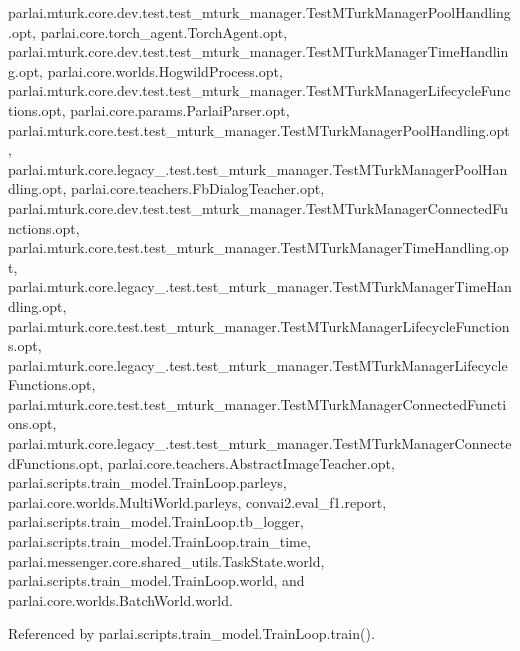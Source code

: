 parlai.\+mturk.\+core.\+dev.\+test.\+test\+\_\+mturk\+\_\+manager.\+Test\+M\+Turk\+Manager\+Pool\+Handling.\+opt, parlai.\+core.\+torch\+\_\+agent.\+Torch\+Agent.\+opt, parlai.\+mturk.\+core.\+dev.\+test.\+test\+\_\+mturk\+\_\+manager.\+Test\+M\+Turk\+Manager\+Time\+Handling.\+opt, parlai.\+core.\+worlds.\+Hogwild\+Process.\+opt, parlai.\+mturk.\+core.\+dev.\+test.\+test\+\_\+mturk\+\_\+manager.\+Test\+M\+Turk\+Manager\+Lifecycle\+Functions.\+opt, parlai.\+core.\+params.\+Parlai\+Parser.\+opt, parlai.\+mturk.\+core.\+test.\+test\+\_\+mturk\+\_\+manager.\+Test\+M\+Turk\+Manager\+Pool\+Handling.\+opt, parlai.\+mturk.\+core.\+legacy\+\_.\+test.\+test\+\_\+mturk\+\_\+manager.\+Test\+M\+Turk\+Manager\+Pool\+Handling.\+opt, parlai.\+core.\+teachers.\+Fb\+Dialog\+Teacher.\+opt, parlai.\+mturk.\+core.\+dev.\+test.\+test\+\_\+mturk\+\_\+manager.\+Test\+M\+Turk\+Manager\+Connected\+Functions.\+opt, parlai.\+mturk.\+core.\+test.\+test\+\_\+mturk\+\_\+manager.\+Test\+M\+Turk\+Manager\+Time\+Handling.\+opt, parlai.\+mturk.\+core.\+legacy\+\_.\+test.\+test\+\_\+mturk\+\_\+manager.\+Test\+M\+Turk\+Manager\+Time\+Handling.\+opt, parlai.\+mturk.\+core.\+test.\+test\+\_\+mturk\+\_\+manager.\+Test\+M\+Turk\+Manager\+Lifecycle\+Functions.\+opt, parlai.\+mturk.\+core.\+legacy\+\_.\+test.\+test\+\_\+mturk\+\_\+manager.\+Test\+M\+Turk\+Manager\+Lifecycle\+Functions.\+opt, parlai.\+mturk.\+core.\+test.\+test\+\_\+mturk\+\_\+manager.\+Test\+M\+Turk\+Manager\+Connected\+Functions.\+opt, parlai.\+mturk.\+core.\+legacy\+\_.\+test.\+test\+\_\+mturk\+\_\+manager.\+Test\+M\+Turk\+Manager\+Connected\+Functions.\+opt, parlai.\+core.\+teachers.\+Abstract\+Image\+Teacher.\+opt, parlai.\+scripts.\+train\+\_\+model.\+Train\+Loop.\+parleys, parlai.\+core.\+worlds.\+Multi\+World.\+parleys, convai2.\+eval\+\_\+f1.\+report, parlai.\+scripts.\+train\+\_\+model.\+Train\+Loop.\+tb\+\_\+logger, parlai.\+scripts.\+train\+\_\+model.\+Train\+Loop.\+train\+\_\+time, parlai.\+messenger.\+core.\+shared\+\_\+utils.\+Task\+State.\+world, parlai.\+scripts.\+train\+\_\+model.\+Train\+Loop.\+world, and parlai.\+core.\+worlds.\+Batch\+World.\+world.



Referenced by parlai.\+scripts.\+train\+\_\+model.\+Train\+Loop.\+train().

